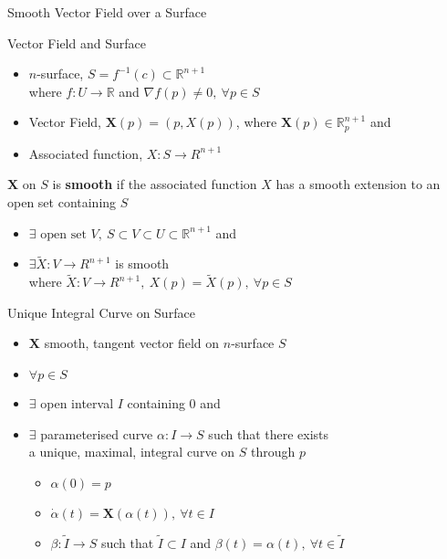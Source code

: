 \documentclass{beamer}
\begin{document}
\begin{frame}{Smooth Vector Field over a Surface}
\begin{block}{Vector Field and Surface}
\begin{itemize}
	\item $n$-surface, $S= f^{-1}(c) \subset \mathbb{R}^{n+1}$\\
		where $f : U \to \mathbb{R}$ and $\nabla f(p) \ne 0,\ \forall p \in S$
	\item Vector Field, $\mathbf{X}(p) = (p,X(p))$, where $\mathbf{X}(p) \in \mathbb{R}_p^{n+1}$ and
	\item Associated function, $X : S \to R^{n+1}$
\end{itemize}
\end{block}
\begin{definition}
	$\mathbf{X}$ on $S$ is \textbf{smooth} if the associated function $X$ has a smooth extension to an open set containing $S$
\begin{itemize}
	\item $\exists \text{ open set }V,\ S \subset V \subset U \subset \mathbb{R}^{n+1}$ and 
	\item $\exists \tilde{X} : V \to R^{n+1}$ is smooth\\
		where $\tilde{X} : V \to R^{n+1},\  X(p) = \tilde{X}(p),\ \forall p \in S$
\end{itemize}
\end{definition}
\end{frame}

\begin{frame}{Unique Integral Curve on Surface}
\begin{theorem}
\begin{itemize}
	\item $\mathbf{X}$ smooth, tangent vector field on $n$-surface $S$
	\item $\forall p \in S$
	\item $\exists$ open interval $I$ containing $0$ and
	\item $\exists$ parameterised curve $\alpha : I \to S$ such that there exists\\
		a unique, maximal, integral curve on $S$ through $p$
	\begin{itemize}
		\item $\alpha(0) = p$
		\item $\dot{\alpha}(t) = \mathbf{X}(\alpha(t)),\ \forall t \in I$
		\item $\beta : \tilde{I} \to S$ such that $\tilde{I} \subset I$ and $\beta(t) = \alpha(t),\ \forall t \in \tilde{I}$
	\end{itemize}
\end{itemize}
\end{theorem}
\end{frame}
\end{document}
